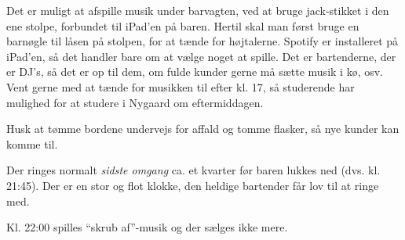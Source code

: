 Det er muligt at afspille musik under barvagten, ved at bruge
jack-stikket i den ene stolpe, forbundet til iPad'en på baren.
Hertil skal man først bruge en barnøgle
til låsen på stolpen, for at tænde for højtalerne.
Spotify er installeret på iPad'en, så det handler bare om at vælge noget at spille.
Det er bartenderne, der er DJ's, så det er op til dem,
om fulde kunder gerne må sætte musik i kø, osv.
Vent gerne med at tænde for musikken til efter kl. 17, så studerende har mulighed
for at studere i Nygaard om eftermiddagen.

Husk at tømme bordene undervejs for affald og tomme flasker, så nye
kunder kan komme til.

Der ringes normalt \textit{sidste omgang}
ca. et kvarter før baren lukkes ned
(dvs. kl. 21:45). Der er en stor og flot klokke, den heldige bartender
får lov til at ringe med.

Kl. 22:00 spilles ``skrub af''-musik og der sælges ikke mere.
